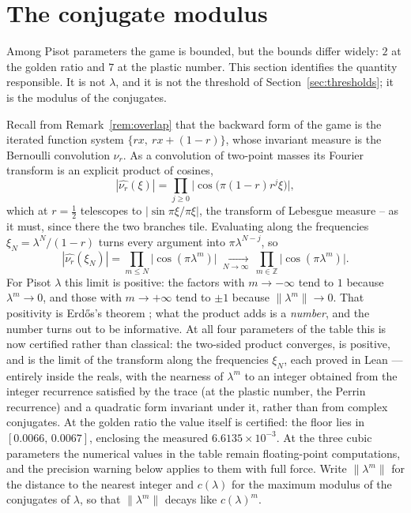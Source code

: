 \documentclass[11pt,reqno]{amsart}
\theoremstyle{plain}
\theoremstyle{definition}
\theoremstyle{remark}
\newcommand{\Z}{\mathbb{Z}}
\begin{document}
\section{The conjugate modulus}\label{sec:conjugate}

Among Pisot parameters the game is bounded, but the bounds differ widely: $2$
at the golden ratio and $7$ at the plastic number. This section identifies the
quantity responsible. It is not $\lambda$, and it is not the threshold of
Section~\ref{sec:thresholds}; it is the modulus of the conjugates.

Recall from Remark~\ref{rem:overlap} that the backward form of the game is the
iterated function system $\{rx,\ rx+(1-r)\}$, whose invariant measure is the
Bernoulli convolution $\nu_r$. As a convolution of two-point masses its Fourier
transform is an explicit product of cosines,
\[
  |\widehat{\nu_r}(\xi)|=\prod_{j\geq0}\bigl|\cos\bigl(\pi(1-r)r^j\xi\bigr)\bigr| ,
\]
which at $r=\tfrac12$ telescopes to $|\sin\pi\xi/\pi\xi|$, the transform of
Lebesgue measure -- as it must, since there the two branches tile. Evaluating
along the frequencies $\xi_N=\lambda^N/(1-r)$ turns every argument into
$\pi\lambda^{N-j}$, so
\[
  |\widehat{\nu_r}(\xi_N)|=\prod_{m\leq N}\bigl|\cos(\pi\lambda^m)\bigr|
  \ \xrightarrow[N\to\infty]{}\ \prod_{m\in\Z}\bigl|\cos(\pi\lambda^m)\bigr| .
\]
For Pisot $\lambda$ this limit is positive: the factors with $m\to-\infty$
tend to $1$ because $\lambda^m\to0$, and those with $m\to+\infty$ tend to $\pm1$
because $\|\lambda^m\|\to0$. That positivity is Erd\H{o}s's theorem
\cite{Erdos1939}; what the product adds is a \emph{number}, and the number
turns out to be informative. At all four parameters of the table this is now
certified rather than classical: the two-sided product converges, is positive,
and is the limit of the transform along the frequencies $\xi_N$, each proved
in Lean --- entirely inside the reals, with the nearness of $\lambda^m$ to an
integer obtained from the integer recurrence satisfied by the trace (at the
plastic number, the Perrin recurrence) and a quadratic form invariant under
it, rather than from complex conjugates. At the golden ratio the value itself
is certified: the floor lies in $[0.0066,\,0.0067]$, enclosing the measured
$6.6135\times10^{-3}$. At the three cubic parameters the numerical values in
the table remain floating-point computations, and the precision warning below
applies to them with full force. Write $\|\lambda^m\|$ for the distance to the
nearest integer and $c(\lambda)$ for the maximum modulus of the conjugates of
$\lambda$, so that $\|\lambda^m\|$ decays like $c(\lambda)^m$.
\end{document}

